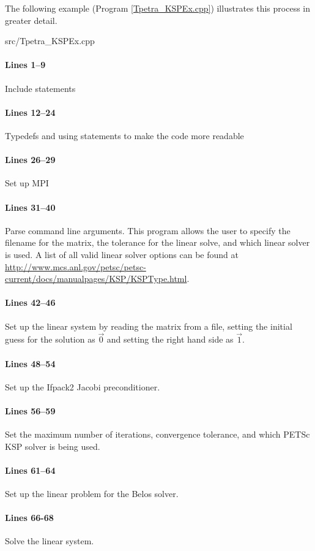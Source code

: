 The following example (Program \ref{Tpetra_KSPEx.cpp}) illustrates this process
in greater detail.

\begin{lstinputlisting}[caption=Tpetra\_KSPEx.cpp,label=Tpetra_KSPEx.cpp]{src/Tpetra_KSPEx.cpp}
\end{lstinputlisting}

\paragraph{Lines 1--9}
Include statements

\paragraph{Lines 12--24}
Typedefs and using statements to make the code more readable

\paragraph{Lines 26--29}
Set up MPI

\paragraph{Lines 31--40}
Parse command line arguments.  This program allows the user to specify the
filename for the matrix, the tolerance for the linear solve, and which linear
solver is used.  A list of all valid linear solver options can be found at
\url{http://www.mcs.anl.gov/petsc/petsc-current/docs/manualpages/KSP/KSPType.html}.

\paragraph{Lines 42--46}
Set up the linear system by reading the matrix from a file, setting the initial
guess for the solution as $\vec{0}$ and setting the right hand side as
$\vec{1}$.

\paragraph{Lines 48--54}
Set up the Ifpack2 Jacobi preconditioner.

\paragraph{Lines 56--59}
Set the maximum number of iterations, convergence tolerance, and which PETSc
KSP solver is being used.

\paragraph{Lines 61--64}
Set up the linear problem for the Belos solver.

\paragraph{Lines 66-68}
Solve the linear system.